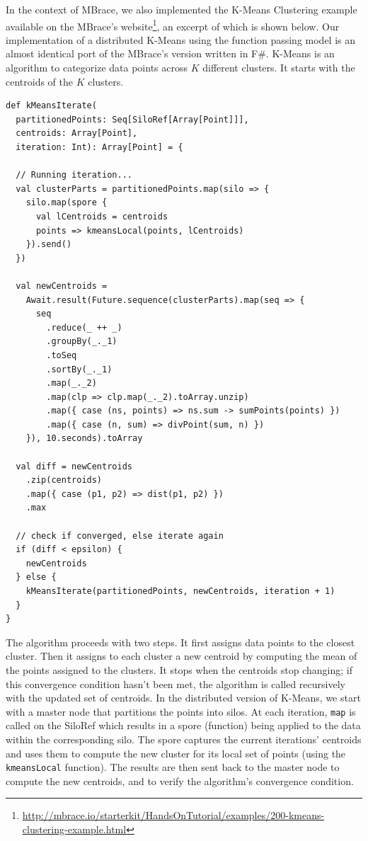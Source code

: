 \documentclass[10pt]{sigplanconf}
\theoremstyle{definition}
\theoremstyle{definition}
\begin{document}
In the context of MBrace, we also implemented the K-Means Clustering example
available on the MBrace's
website\footnote{\url{http://mbrace.io/starterkit/HandsOnTutorial/examples/200-kmeans-clustering-example.html}},
an excerpt of which is shown below. Our implementation of a distributed K-Means
using the function passing model is an almost identical port of the MBrace’s
version written in F\#. K-Means is an algorithm to categorize data points across
$K$ different clusters. It starts with the centroids of the $K$ clusters.

\begin{lstlisting}
def kMeansIterate(
  partitionedPoints: Seq[SiloRef[Array[Point]]],
  centroids: Array[Point],
  iteration: Int): Array[Point] = {

  // Running iteration...
  val clusterParts = partitionedPoints.map(silo => {
    silo.map(spore {
      val lCentroids = centroids
      points => kmeansLocal(points, lCentroids)
    }).send()
  })

  val newCentroids =
    Await.result(Future.sequence(clusterParts).map(seq => {
      seq
        .reduce(_ ++ _)
        .groupBy(_._1)
        .toSeq
        .sortBy(_._1)
        .map(_._2)
        .map(clp => clp.map(_._2).toArray.unzip)
        .map({ case (ns, points) => ns.sum -> sumPoints(points) })
        .map({ case (n, sum) => divPoint(sum, n) })
    }), 10.seconds).toArray

  val diff = newCentroids
    .zip(centroids)
    .map({ case (p1, p2) => dist(p1, p2) })
    .max

  // check if converged, else iterate again
  if (diff < epsilon) {
    newCentroids
  } else {
    kMeansIterate(partitionedPoints, newCentroids, iteration + 1)
  }
}
\end{lstlisting}

The algorithm proceeds with two steps. It first assigns data points to the
closest cluster. Then it assigns to each cluster a new centroid by computing the
mean of the points assigned to the clusters. It stops when the centroids stop
changing; if this convergence condition hasn't been met, the algorithm is called
recursively with the updated set of centroids. In the distributed version of
K-Means, we start with a master node that partitions the points into silos. At
each iteration, \verb|map| is called on the SiloRef which results in a spore
(function) being applied to the data within the corresponding silo. The spore
captures the current iterations' centroids and uses them to compute the new
cluster for its local set of points (using the \verb|kmeansLocal| function). The
results are then sent back to the master node to compute the new centroids, and
to verify the algorithm's convergence condition.
\end{document}
